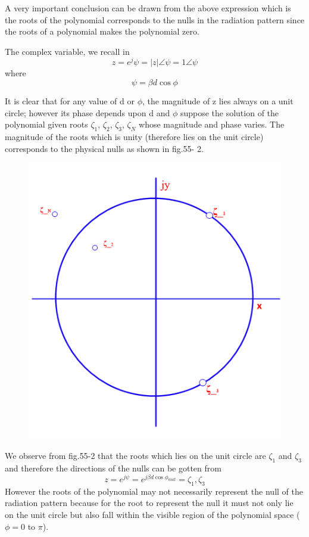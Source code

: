 A very important conclusion can be drawn from the above expression which is the roots of the polynomial corresponds to the nulls in the radiation pattern since the roots of a polynomial makes the polynomial zero.

The complex variable, we recall in 
$$z=e^j{\psi}=|z|\angle\psi = 1\angle\psi$$
where $$\psi=\beta d\cos\phi$$

It is clear that for any value of d or $\phi$, the magnitude of z lies always on a unit circle; however its phase depends upon d and $\phi$ suppose the solution of the polynomial given roots $\zeta_{1}$, $\zeta_{2}$, $\zeta_{3}$, $\zeta_{N}$ whose magnitude and phase varies. The magnitude of the roots which is unity (therefore lies on the unit circle) corresponds to the physical nulls as shown in fig.55- 2.
\begin{figure}[h]
\centering
\includegraphics[width=1\linewidth]{"./graphics/image58_2"}
\caption{}
\label{fig:fig 55_2}
\end{figure}

We observe from fig.55-2 that the roots which lies on the unit circle are $\zeta_1$ and $\zeta_3$ and therefore the directions of the nulls can be gotten from $$z=e^{j\psi}=e^{j\beta d\cos\phi_{null}}=\zeta_1, \zeta_3$$ However the roots of the polynomial may not necessarily represent the null of the radiation pattern because for the root to represent the null it  must not only lie on the unit circle but also fall within the visible region of the polynomial space ($\phi=0$ to $\pi$).

